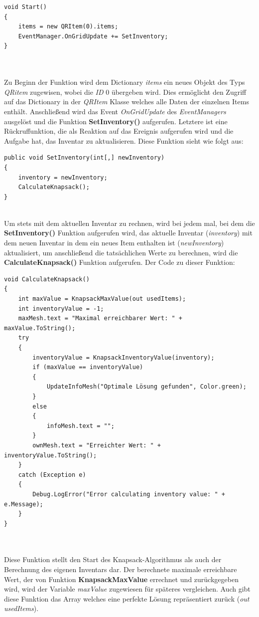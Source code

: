 \begin{lstlisting}[style=csharp, caption={Klassenvariablen der InventoryController Klasse}, label=code:kn_start]
void Start()
{
    items = new QRItem(0).items;
    EventManager.OnGridUpdate += SetInventory;
}
\end{lstlisting}\\
\\
Zu Beginn der Funktion wird dem Dictionary \textit{items} ein neues Objekt des Typs \textit{QRitem} zugewisen, wobei die
\textit{ID} 0 übergeben wird. Dies ermöglicht den Zugriff auf das Dictionary in der \textit{QRItem} Klasse welches alle
Daten der einzelnen Items enthält. Anschließend wird das Event \textit{OnGridUpdate} des \textit{EventManagers} ausgelöst
und die Funktion \textbf{SetInventory()} aufgerufen. Letztere ist eine Rückruffunktion, die als Reaktion auf das Ereignis
aufgerufen wird und die Aufgabe hat, das Inventar zu aktualisieren. Diese Funktion sieht wie folgt aus:
\begin{lstlisting}[style=csharp, caption={Inventar setzen}, label=code:kn_start]
public void SetInventory(int[,] newInventory)
{
    inventory = newInventory;
    CalculateKnapsack();
}
\end{lstlisting}
\\
Um stets mit dem aktuellen Inventar zu rechnen, wird bei jedem mal, bei dem die \textbf{SetInventory()} Funktion
aufgerufen wird, das aktuelle Inventar (\textit{inventory}) mit dem neuen Inventar in dem ein neues Item enthalten ist
(\textit{newInventory}) aktualisiert, um anschließend die tatsächlichen Werte zu berechnen, wird die \textbf{CalculateKnapsack()}
Funktion aufgerufen. Der Code zu dieser Funktion:
\begin{lstlisting}[style=csharp, caption={Berechnungsfunktion}, label=code:kn_calc]
void CalculateKnapsack()
{
    int maxValue = KnapsackMaxValue(out usedItems);
    int inventoryValue = -1;
    maxMesh.text = "Maximal erreichbarer Wert: " + maxValue.ToString();
    try
    {
        inventoryValue = KnapsackInventoryValue(inventory);
        if (maxValue == inventoryValue)
        {
            UpdateInfoMesh("Optimale Lösung gefunden", Color.green);
        }
        else
        {
            infoMesh.text = "";
        }
        ownMesh.text = "Erreichter Wert: " + inventoryValue.ToString();
    }
    catch (Exception e)
    {
        Debug.LogError("Error calculating inventory value: " + e.Message);
    }
}
\end{lstlisting}\\
\\
Diese Funktion stellt den Start des Knapsack-Algorithmus als auch der Berechnung des eigenen Inventars dar. Der berechnete
maximale erreichbare Wert, der von Funktion \textbf{KnapsackMaxValue} errechnet und zurückgegeben wird, wird der Variable
\textit{maxValue} zugewiesen für späteres vergleichen. Auch gibt diese Funktion das Array welches eine perfekte Lösung
repräsentiert zurück (\textit{out usedItems}).

